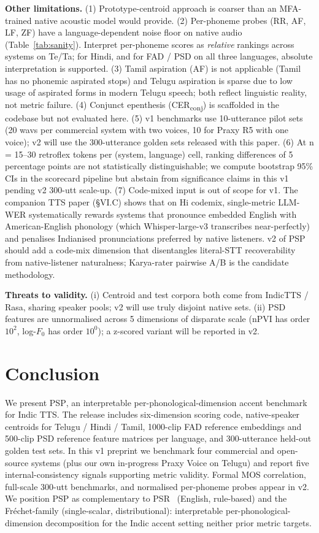 \documentclass[conference,a4paper]{IEEEtran}
\newcommand{\psp}{\textsc{PSP}}
\begin{document}
\textbf{Other limitations.} (1) Prototype-centroid approach is coarser than an MFA-trained native acoustic model would provide. (2) Per-phoneme probes (RR, AF, LF, ZF) have a language-dependent noise floor on native audio (Table~\ref{tab:sanity}). Interpret per-phoneme scores as \emph{relative} rankings across systems on Te/Ta; for Hindi, and for FAD / PSD on all three languages, absolute interpretation is supported. (3) Tamil aspiration (AF) is not applicable (Tamil has no phonemic aspirated stops) and Telugu aspiration is sparse due to low usage of aspirated forms in modern Telugu speech; both reflect linguistic reality, not metric failure. (4) Conjunct epenthesis (CER\textsubscript{conj}) is scaffolded in the codebase but not evaluated here. (5) v1 benchmarks use 10-utterance pilot sets (20 wavs per commercial system with two voices, 10 for Praxy R5 with one voice); v2 will use the 300-utterance golden sets released with this paper. (6) At n = 15--30 retroflex tokens per (system, language) cell, ranking differences of 5 percentage points are not statistically distinguishable; we compute bootstrap 95\% CIs in the scorecard pipeline but abstain from significance claims in this v1 pending v2 300-utt scale-up. (7) Code-mixed input is out of scope for v1. The companion TTS paper (\S VI.C) shows that on Hi codemix, single-metric LLM-WER systematically rewards systems that pronounce embedded English with American-English phonology (which Whisper-large-v3 transcribes near-perfectly) and penalises Indianised pronunciations preferred by native listeners. v2 of PSP should add a code-mix dimension that disentangles literal-STT recoverability from native-listener naturalness; Karya-rater pairwise A/B is the candidate methodology.

\textbf{Threats to validity.} (i) Centroid and test corpora both come from IndicTTS / Rasa, sharing speaker pools; v2 will use truly disjoint native sets. (ii) PSD features are unnormalised across 5 dimensions of disparate scale (nPVI has order $10^2$, log-$F_0$ has order $10^0$); a z-scored variant will be reported in v2.

\section{Conclusion}
\label{sec:conclusion}

We present \psp, an interpretable per-phonological-dimension accent benchmark for Indic TTS. The release includes six-dimension scoring code, native-speaker centroids for Telugu / Hindi / Tamil, 1000-clip FAD reference embeddings and 500-clip PSD reference feature matrices per language, and 300-utterance held-out golden test sets. In this v1 preprint we benchmark four commercial and open-source systems (plus our own in-progress Praxy Voice on Telugu) and report five internal-consistency signals supporting metric validity. Formal MOS correlation, full-scale 300-utt benchmarks, and normalised per-phoneme probes appear in v2. We position \psp{} as complementary to PSR~\cite{psr2026} (English, rule-based) and the Fr\'echet-family (single-scalar, distributional): interpretable per-phonological-dimension decomposition for the Indic accent setting neither prior metric targets.
\end{document}
